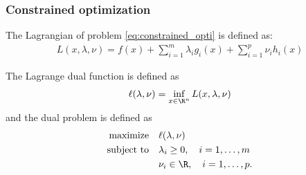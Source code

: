 \documentclass{beamer}
\begin{document}
\begin{frame}[t]
\frametitle{Constrained optimization}
\vspace{-10pt}
\begin{definition} [Lagrangian]
The Lagrangian of problem \eqref{eq:constrained_opti} is defined as:
\vspace{-5pt}
\begin{align*}
L(x, \lambda, \nu) = f(x) + \sum_{i=1}^m \lambda_i g_i(x) + \sum_{i=1}^p \nu_i h_i(x) 
\end{align*}
\vspace{-5pt}
\end{definition}
\vspace{-5pt}
\begin{definition} 
The Lagrange dual function is defined as 
\vspace{-5pt}
\begin{align*}
\ell(\lambda,\nu) = \inf_{x \in \R^n} L(x, \lambda, \nu)
\end{align*}
\vspace{-5pt}
and the dual problem is defined as
\vspace{-5pt}
\begin{align} 
\begin{split} \label{eq:dual}
\text{maximize} \quad &\ell(\lambda,\nu) \\
\text{subject to} \quad &\lambda_i \geq 0, \quad i = 1, \dots, m \\
                            &\nu_i \in \R, \quad i = 1, \dots, p.
\end{split}                            
\end{align}
\vspace{-5pt}
\end{definition}
\end{frame}
\end{document}

